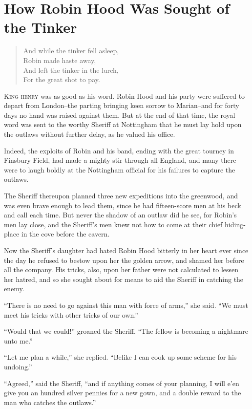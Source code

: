 \chapter{How Robin Hood Was Sought of the Tinker}

\begin{quote}
And while the tinker fell asleep,\\
Robin made haste away,\\
And left the tinker in the lurch,\\
For the great shot to pay.
\end{quote}

\lettrine{K}{\MakeLowercase{ing Henry}} was as good as his word. Robin Hood and his party
were suffered to depart from London--the parting bringing keen sorrow to
Marian--and for forty days no hand was raised against them. But at the
end of that time, the royal word was sent to the worthy Sheriff at
Nottingham that he must lay hold upon the outlaws without further delay,
as he valued his office.

Indeed, the exploits of Robin and his band, ending with the great
tourney in Finsbury Field, had made a mighty stir through all England,
and many there were to laugh boldly at the Nottingham official for his
failures to capture the outlaws.

The Sheriff thereupon planned three new expeditions into the greenwood,
and was even brave enough to lead them, since he had fifteen-score men
at his beck and call each time. But never the shadow of an outlaw did he
see, for Robin's men lay close, and the Sheriff's men knew not how to
come at their chief hiding-place in the cove before the cavern.

Now the Sheriff's daughter had hated Robin Hood bitterly in her heart
ever since the day he refused to bestow upon her the golden arrow, and
shamed her before all the company. His tricks, also, upon her father
were not calculated to lessen her hatred, and so she sought about for
means to aid the Sheriff in catching the enemy.

``There is no need to go against this man with force of arms,'' she
said. ``We must meet his tricks with other tricks of our own.''

``Would that we could!'' groaned the Sheriff. ``The fellow is becoming a
nightmare unto me.''

``Let me plan a while,'' she replied. ``Belike I can cook up some scheme
for his undoing.''

``Agreed,'' said the Sheriff, ``and if anything comes of your planning,
I will e'en give you an hundred silver pennies for a new gown, and a
double reward to the man who catches the outlaws.''

